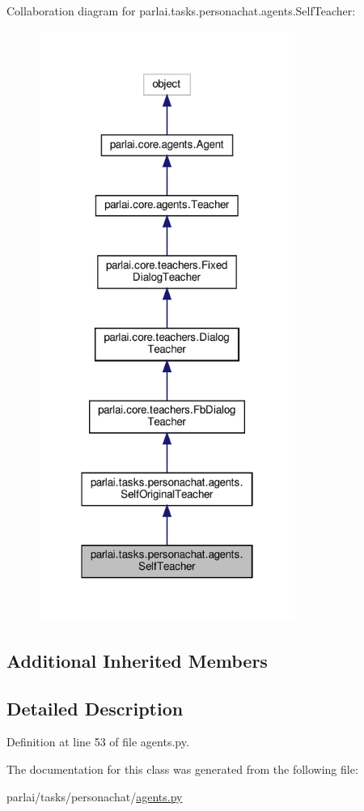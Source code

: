 Collaboration diagram for parlai.\+tasks.\+personachat.\+agents.\+Self\+Teacher\+:\nopagebreak
\begin{figure}[H]
\begin{center}
\leavevmode
\includegraphics[width=238pt]{d7/d6d/classparlai_1_1tasks_1_1personachat_1_1agents_1_1SelfTeacher__coll__graph}
\end{center}
\end{figure}
\subsection*{Additional Inherited Members}


\subsection{Detailed Description}


Definition at line 53 of file agents.\+py.



The documentation for this class was generated from the following file\+:\begin{DoxyCompactItemize}
\item 
parlai/tasks/personachat/\hyperlink{parlai_2tasks_2personachat_2agents_8py}{agents.\+py}\end{DoxyCompactItemize}
